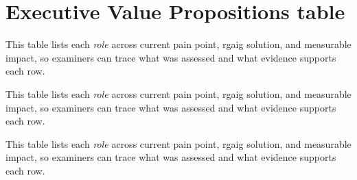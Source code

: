 \section{Executive Value Propositions table}
\label{sec:appendix_ch5_s3}


\noindent This table lists each \textit{role} across current pain point, rgaig solution, and measurable impact, so examiners can trace what was assessed and what evidence supports each row.



\noindent This table lists each \textit{role} across current pain point, rgaig solution, and measurable impact, so examiners can trace what was assessed and what evidence supports each row.


\noindent This table lists each \textit{role} across current pain point, rgaig solution, and measurable impact, so examiners can trace what was assessed and what evidence supports each row.



